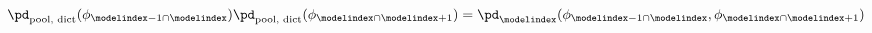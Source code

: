 \begin{equation}
  \pd_{\text{pool, dict}}(\phi_{\modelindex - 1 \cap \modelindex})
  \pd_{\text{pool, dict}}(\phi_{\modelindex \cap \modelindex + 1}) =
    \pd_{\modelindex}(\phi_{\modelindex - 1 \cap \modelindex}, \phi_{\modelindex \cap \modelindex + 1})
  \label{eqn:dictatorial-def-three-part-three}
\end{equation}